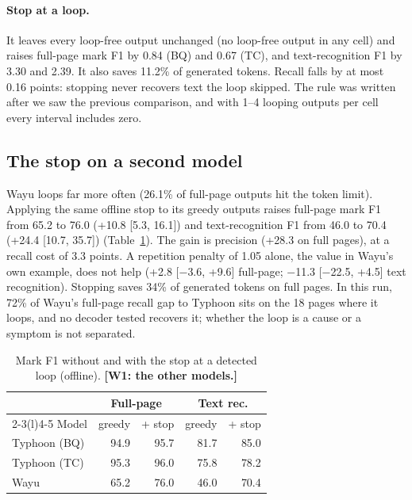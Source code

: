\documentclass[10pt,twocolumn]{article}
\newcommand{\todo}[1]{\textcolor{red!70!black}{\textbf{[#1]}}}
\begin{document}
\paragraph{Stop at a loop.} It leaves every loop-free output unchanged (no loop-free output in any cell) and raises full-page mark F1 by 0.84 (BQ) and 0.67 (TC), and text-recognition F1 by 3.30 and 2.39. It also saves 11.2\% of generated tokens. Recall falls by at most 0.16 points: stopping never recovers text the loop skipped. The rule was written after we saw the previous comparison, and with 1--4 looping outputs per cell every interval includes zero.

\subsection{The stop on a second model}
Wayu loops far more often (26.1\% of full-page outputs hit the token limit). Applying the same offline stop to its greedy outputs raises full-page mark F1 from 65.2 to 76.0 (+10.8 [5.3, 16.1]) and text-recognition F1 from 46.0 to 70.4 (+24.4 [10.7, 35.7]) (Table~\ref{tab:stop}). The gain is precision (+28.3 on full pages), at a recall cost of 3.3 points. A repetition penalty of 1.05 alone, the value in Wayu's own example, does not help (+2.8 [$-$3.6, +9.6] full-page; $-$11.3 [$-$22.5, +4.5] text recognition). Stopping saves 34\% of generated tokens on full pages. In this run, 72\% of Wayu's full-page recall gap to Typhoon sits on the 18 pages where it loops, and no decoder tested recovers it; whether the loop is a cause or a symptom is not separated.

\begin{table}[t]
\centering\small
\begin{tabular}{@{}l rr rr@{}}
\toprule
 & \multicolumn{2}{c}{Full-page} & \multicolumn{2}{c}{Text rec.}\\
\cmidrule(lr){2-3}\cmidrule(l){4-5}
Model & greedy & + stop & greedy & + stop\\
\midrule
Typhoon (BQ) & 94.9 & 95.7 & 81.7 & 85.0\\
Typhoon (TC) & 95.3 & 96.0 & 75.8 & 78.2\\
Wayu & 65.2 & 76.0 & 46.0 & 70.4\\
\bottomrule
\end{tabular}
\caption{Mark F1 without and with the stop at a detected loop (offline). \todo{W1: the other models.}}\label{tab:stop}
\end{table}
\end{document}
